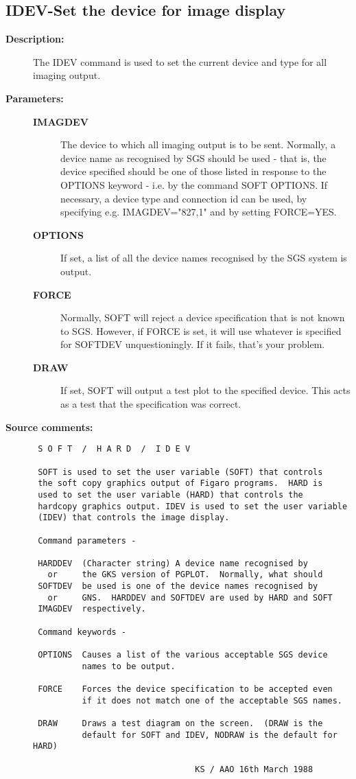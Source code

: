 \subsection{IDEV-\label{IDEV}Set the device for image display}
\begin{description}

\item [{\bf Description:}]
 The IDEV command is used to set the current device
 and type for all imaging output.

\item [{\bf Parameters:}]
\begin{description}
\item [{\bf IMAGDEV}]
 The device to which all imaging output is to be
 sent. Normally, a device name as recognised by
 SGS  should be used - that is, the device specified
 should be one of those listed in response to the
 OPTIONS keyword - i.e. by the command SOFT OPTIONS.
 If necessary, a device type and connection id can
 be used, by specifying e.g. IMAGDEV="827,1" and by
 setting FORCE=YES.
\item [{\bf OPTIONS}]
 If set, a list of all the device names recognised
 by the SGS system is output.
\item [{\bf FORCE}]
 Normally, SOFT will reject a device specification
 that is not known to SGS.  However, if FORCE is
 set, it will use whatever is specified for SOFTDEV
 unquestioningly.  If it fails, that's your problem.
\item [{\bf DRAW}]
 If set, SOFT will output a test plot to the
 specified device.  This acts as a test that
 the specification was correct.
\end{description}

\item [{\bf Source comments:}]
\begin{verbatim}
 S O F T  /  H A R D  /  I D E V

 SOFT is used to set the user variable (SOFT) that controls
 the soft copy graphics output of Figaro programs.  HARD is
 used to set the user variable (HARD) that controls the
 hardcopy graphics output. IDEV is used to set the user variable
 (IDEV) that controls the image display.

 Command parameters -

 HARDDEV  (Character string) A device name recognised by
   or     the GKS version of PGPLOT.  Normally, what should
 SOFTDEV  be used is one of the device names recognised by
   or     GNS.  HARDDEV and SOFTDEV are used by HARD and SOFT
 IMAGDEV  respectively.

 Command keywords -

 OPTIONS  Causes a list of the various acceptable SGS device
          names to be output.

 FORCE    Forces the device specification to be accepted even
          if it does not match one of the acceptable SGS names.

 DRAW     Draws a test diagram on the screen.  (DRAW is the
          default for SOFT and IDEV, NODRAW is the default for HARD)

                                 KS / AAO 16th March 1988
\end{verbatim}
\end{description}
